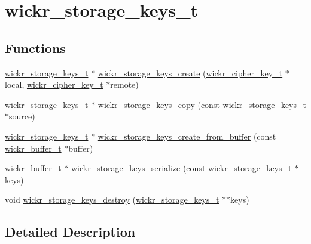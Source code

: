 \hypertarget{group__wickr__storage__keys}{}\section{wickr\+\_\+storage\+\_\+keys\+\_\+t}
\label{group__wickr__storage__keys}
\subsection*{Functions}
\begin{DoxyCompactItemize}
\item 
\hyperlink{structwickr__storage__keys}{wickr\+\_\+storage\+\_\+keys\+\_\+t} $\ast$ \hyperlink{group__wickr__storage__keys_gad03ddd5ea10633ca35097e5f4707d5cb}{wickr\+\_\+storage\+\_\+keys\+\_\+create} (\hyperlink{structwickr__cipher__key}{wickr\+\_\+cipher\+\_\+key\+\_\+t} $\ast$local, \hyperlink{structwickr__cipher__key}{wickr\+\_\+cipher\+\_\+key\+\_\+t} $\ast$remote)
\item 
\hyperlink{structwickr__storage__keys}{wickr\+\_\+storage\+\_\+keys\+\_\+t} $\ast$ \hyperlink{group__wickr__storage__keys_gad6839a21bca1c28775d51deb6b7c3835}{wickr\+\_\+storage\+\_\+keys\+\_\+copy} (const \hyperlink{structwickr__storage__keys}{wickr\+\_\+storage\+\_\+keys\+\_\+t} $\ast$source)
\item 
\hyperlink{structwickr__storage__keys}{wickr\+\_\+storage\+\_\+keys\+\_\+t} $\ast$ \hyperlink{group__wickr__storage__keys_gae5631d93182e635fb7f48269eb3f1723}{wickr\+\_\+storage\+\_\+keys\+\_\+create\+\_\+from\+\_\+buffer} (const \hyperlink{structwickr__buffer}{wickr\+\_\+buffer\+\_\+t} $\ast$buffer)
\item 
\hyperlink{structwickr__buffer}{wickr\+\_\+buffer\+\_\+t} $\ast$ \hyperlink{group__wickr__storage__keys_ga10a0d6e13442682b2fecff2ed753c2f6}{wickr\+\_\+storage\+\_\+keys\+\_\+serialize} (const \hyperlink{structwickr__storage__keys}{wickr\+\_\+storage\+\_\+keys\+\_\+t} $\ast$keys)
\item 
void \hyperlink{group__wickr__storage__keys_ga2c1494802577d025d70bf553c43da344}{wickr\+\_\+storage\+\_\+keys\+\_\+destroy} (\hyperlink{structwickr__storage__keys}{wickr\+\_\+storage\+\_\+keys\+\_\+t} $\ast$$\ast$keys)
\end{DoxyCompactItemize}


\subsection{Detailed Description}


